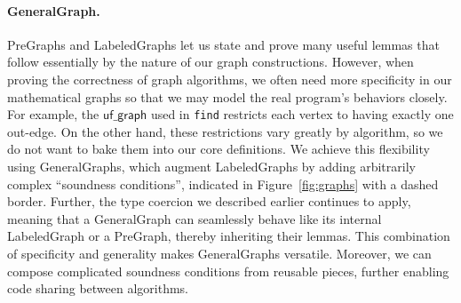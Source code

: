 \documentclass[acmsmall,screen]{acmart}
\newcommand{\li}[1]{{\texttt{\small #1}}}
\newcommand{\p}[1]{\ensuremath{\mathsf{#1}}} \newcommand{\m}[1]{\ensuremath{\mathit{#1}}} \newcommand{\ma}[1]{\ensuremath{\mathcal{#1}}} \let\ramify\lightning
\begin{document}
\vspace{-0.75ex}
\paragraph{GeneralGraph.}
PreGraphs and LabeledGraphs let us state
and prove many useful lemmas that follow essentially by the nature
of our graph constructions. However, when proving the correctness of graph
algorithms, we often need more specificity in our mathematical graphs
so that we may model the real program's behaviors closely.
For example, the \p{uf\_graph} used in \li{find}
restricts each vertex to having exactly one out-edge.
On the other hand, these restrictions vary greatly by algorithm, so we do not
want to bake them into our core definitions.
We achieve this flexibility using GeneralGraphs, which augment
LabeledGraphs by adding arbitrarily complex ``soundness conditions'', indicated in
Figure~\ref{fig:graphs} with a dashed border.
Further, the type coercion we described earlier continues to apply,
meaning that a GeneralGraph can seamlessly behave like its internal
LabeledGraph or a PreGraph, thereby inheriting their lemmas.
This combination of specificity and generality
makes GeneralGraphs versatile. Moreover, we can
compose complicated soundness conditions from reusable pieces,
further enabling code sharing between algorithms.
\end{document}
